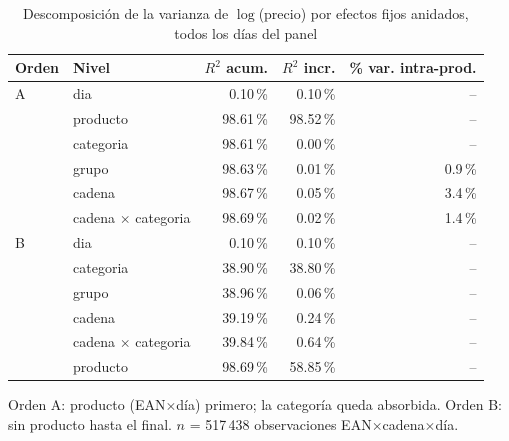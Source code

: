 \begin{table}[htbp]
\caption{Descomposici\'on de la varianza de $\log$(precio) por efectos fijos anidados, todos los d\'ias del panel}
\label{tab:varianza}
\centering\scriptsize\setlength{\tabcolsep}{3pt}
\begin{tabular}{@{}llrrr@{}}
\toprule
Orden & Nivel & $R^2$ acum. & $R^2$ incr. & \% var. intra-prod. \\
\midrule
A & dia & 0.10\,\% & 0.10\,\% & -- \\
 & producto & 98.61\,\% & 98.52\,\% & -- \\
 & categoria & 98.61\,\% & 0.00\,\% & -- \\
 & grupo & 98.63\,\% & 0.01\,\% & 0.9\,\% \\
 & cadena & 98.67\,\% & 0.05\,\% & 3.4\,\% \\
 & cadena $\times$ categoria & 98.69\,\% & 0.02\,\% & 1.4\,\% \\
\midrule
B & dia & 0.10\,\% & 0.10\,\% & -- \\
 & categoria & 38.90\,\% & 38.80\,\% & -- \\
 & grupo & 38.96\,\% & 0.06\,\% & -- \\
 & cadena & 39.19\,\% & 0.24\,\% & -- \\
 & cadena $\times$ categoria & 39.84\,\% & 0.64\,\% & -- \\
 & producto & 98.69\,\% & 58.85\,\% & -- \\
\bottomrule\end{tabular}
\par\smallskip\raggedright\scriptsize Orden A: producto (EAN$\times$d\'ia) primero; la categor\'ia queda absorbida. Orden B: sin producto hasta el final. $n$ = 517\,438 observaciones EAN$\times$cadena$\times$d\'ia.
\end{table}
